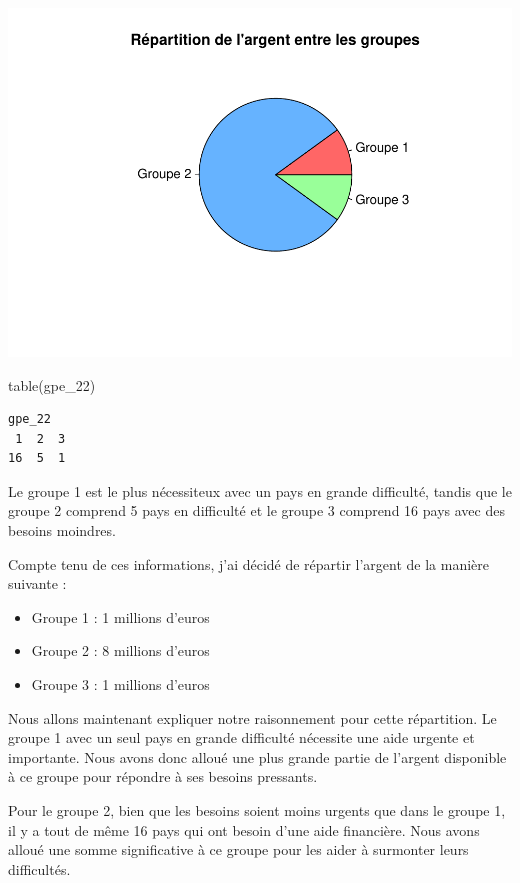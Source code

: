 \documentclass[
]{article}
\newenvironment{Shaded}{}{}
\newcommand{\FunctionTok}[1]{#1}
\newcommand{\NormalTok}[1]{#1}
\begin{document}
\includegraphics{Projet_files/figure-latex/unnamed-chunk-46-1.pdf}

\begin{Shaded}
\begin{Highlighting}[]
\FunctionTok{table}\NormalTok{(gpe\_22)}
\end{Highlighting}
\end{Shaded}

\begin{verbatim}
gpe_22
 1  2  3 
16  5  1 
\end{verbatim}

Le groupe 1 est le plus nécessiteux avec un pays en grande difficulté,
tandis que le groupe 2 comprend 5 pays en difficulté et le groupe 3
comprend 16 pays avec des besoins moindres.

Compte tenu de ces informations, j'ai décidé de répartir l'argent de la
manière suivante :

\begin{itemize}
\item
  Groupe 1 : 1 millions d'euros
\item
  Groupe 2 : 8 millions d'euros
\item
  Groupe 3 : 1 millions d'euros
\end{itemize}

Nous allons maintenant expliquer notre raisonnement pour cette
répartition. Le groupe 1 avec un seul pays en grande difficulté
nécessite une aide urgente et importante. Nous avons donc alloué une
plus grande partie de l'argent disponible à ce groupe pour répondre à
ses besoins pressants.

Pour le groupe 2, bien que les besoins soient moins urgents que dans le
groupe 1, il y a tout de même 16 pays qui ont besoin d'une aide
financière. Nous avons alloué une somme significative à ce groupe pour
les aider à surmonter leurs difficultés.
\end{document}
